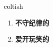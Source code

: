 
\begin{frame}
{\huge coltish}
\begin{center}
\begin{enumerate}\Large
  \item \textbf{不守纪律的}
  \item \textbf{爱开玩笑的}
\end{enumerate}
\end{center}
\end{frame}
